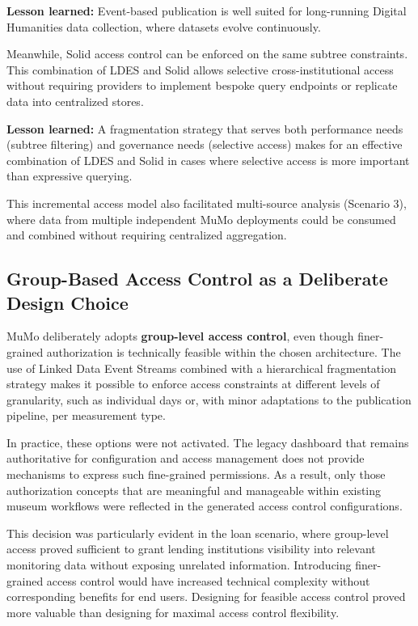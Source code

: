 \documentclass{ceurart}
\begin{document}
\textbf{Lesson learned:} Event-based publication is well suited for
long-running Digital Humanities data collection, where datasets evolve
continuously.

Meanwhile, Solid access control can be enforced on the same subtree
constraints. This combination of LDES and Solid allows selective
cross-institutional access without requiring providers to implement
bespoke query endpoints or replicate data into centralized stores.

\textbf{Lesson learned:} A fragmentation strategy that serves both
performance needs (subtree filtering) and governance needs (selective
access) makes for an effective combination of LDES and Solid in cases
where selective access is more important than expressive querying.

This incremental access model also facilitated multi-source analysis
(Scenario 3), where data from multiple independent MuMo deployments
could be consumed and combined without requiring centralized
aggregation.

\subsection{Group-Based Access Control as a Deliberate Design
Choice}\label{group-based-access-control-as-a-deliberate-design-choice}

MuMo deliberately adopts \textbf{group-level access control}, even
though finer-grained authorization is technically feasible within the
chosen architecture. The use of Linked Data Event Streams combined with
a hierarchical fragmentation strategy makes it possible to enforce
access constraints at different levels of granularity, such as
individual days or, with minor adaptations to the publication pipeline,
per measurement type.

In practice, these options were not activated. The legacy dashboard that
remains authoritative for configuration and access management does not
provide mechanisms to express such fine-grained permissions. As a
result, only those authorization concepts that are meaningful and
manageable within existing museum workflows were reflected in the
generated access control configurations.

This decision was particularly evident in the loan scenario, where
group-level access proved sufficient to grant lending institutions
visibility into relevant monitoring data without exposing unrelated
information. Introducing finer-grained access control would have
increased technical complexity without corresponding benefits for end
users. Designing for feasible access control proved more valuable than
designing for maximal access control flexibility.
\end{document}
